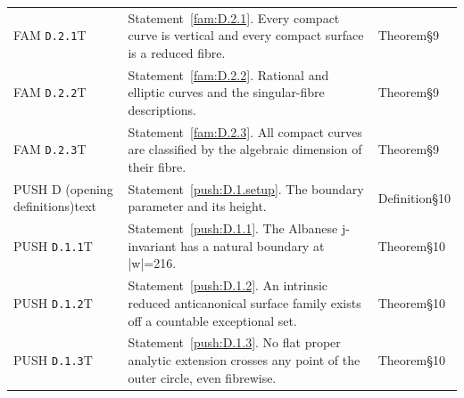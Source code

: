 \begin{longtable}{@{}L{.18\linewidth}L{.48\linewidth}L{.29\linewidth}@{}}
FAM \nolinkurl{D.2.1}\newline T & Statement~\ref{fam:D.2.1}. Every compact curve is vertical and every compact surface is a reduced fibre.\newline {} & Theorem\newline §9\\
FAM \nolinkurl{D.2.2}\newline T & Statement~\ref{fam:D.2.2}. Rational and elliptic curves and the singular-fibre descriptions.\newline {} & Theorem\newline §9\\
FAM \nolinkurl{D.2.3}\newline T & Statement~\ref{fam:D.2.3}. All compact curves are classified by the algebraic dimension of their fibre.\newline {} & Theorem\newline §9\\
PUSH D (opening definitions)\newline text & Statement~\ref{push:D.1.setup}. The boundary parameter and its height.\newline {} & Definition\newline §10\\
PUSH \nolinkurl{D.1.1}\newline T & Statement~\ref{push:D.1.1}. The Albanese j-invariant has a natural boundary at |w|=216.\newline {} & Theorem\newline §10\\
PUSH \nolinkurl{D.1.2}\newline T & Statement~\ref{push:D.1.2}. An intrinsic reduced anticanonical surface family exists off a countable exceptional set.\newline {} & Theorem\newline §10\\
PUSH \nolinkurl{D.1.3}\newline T & Statement~\ref{push:D.1.3}. No flat proper analytic extension crosses any point of the outer circle, even fibrewise.\newline {} & Theorem\newline §10\\

\end{longtable}
